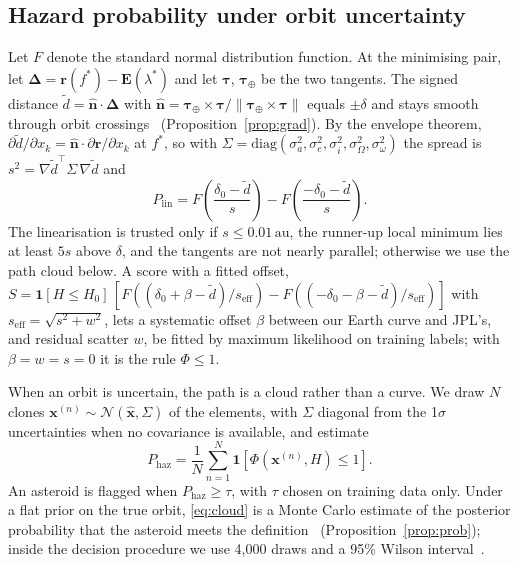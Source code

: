\documentclass[make,article,submit,moreauthors]{Definitions/mdpi}
\newcommand{\au}{\,\mathrm{au}}
\begin{document}
\subsection{Hazard probability under orbit uncertainty}
\label{sec:prob}
Let $F$ denote the standard normal distribution function. At the minimising pair, let $\boldsymbol{\Delta} = \mathbf{r}(f^*) - \mathbf{E}(\lambda^*)$ and let $\boldsymbol{\tau}$, $\boldsymbol{\tau}_\oplus$ be the two tangents. The signed distance $\tilde d = \hat{\mathbf{n}}\cdot\boldsymbol{\Delta}$ with $\hat{\mathbf{n}} = \boldsymbol{\tau}_\oplus\times\boldsymbol{\tau}/\lVert\boldsymbol{\tau}_\oplus\times\boldsymbol{\tau}\rVert$ equals $\pm\delta$ and stays smooth through orbit crossings~\cite{gronchi2007} (Proposition~\ref{prop:grad}). By the envelope theorem, $\partial\tilde d/\partial x_k = \hat{\mathbf{n}}\cdot\partial\mathbf{r}/\partial x_k$ at $f^*$, so with $\Sigma = \mathrm{diag}(\sigma_a^2, \sigma_e^2, \sigma_i^2, \sigma_\Omega^2, \sigma_\omega^2)$ the spread is $s^2 = \nabla\tilde d^{\top}\Sigma\,\nabla\tilde d$ and
\begin{equation}
P_{\mathrm{lin}} = F\!\left(\frac{\delta_0 - \tilde d}{s}\right) - F\!\left(\frac{-\delta_0 - \tilde d}{s}\right).
\label{eq:plin}
\end{equation}
The linearisation is trusted only if $s \le 0.01\au$, the runner-up local minimum lies at least $5s$ above $\delta$, and the tangents are not nearly parallel; otherwise we use the path cloud below. A score with a fitted offset, $S = \mathbf{1}[H \le H_0]\,[F((\delta_0 + \beta - \tilde d)/s_{\mathrm{eff}}) - F((-\delta_0 - \beta - \tilde d)/s_{\mathrm{eff}})]$ with $s_{\mathrm{eff}} = \sqrt{s^2 + w^2}$, lets a systematic offset $\beta$ between our Earth curve and JPL's, and residual scatter $w$, be fitted by maximum likelihood on training labels; with $\beta = w = s = 0$ it is the rule $\Phi \le 1$.

When an orbit is uncertain, the path is a cloud rather than a curve. We draw $N$ clones $\mathbf{x}^{(n)} \sim \mathcal{N}(\hat{\mathbf{x}}, \Sigma)$ of the elements, with $\Sigma$ diagonal from the 1$\sigma$ uncertainties when no covariance is available, and estimate
\begin{equation}
P_{\mathrm{haz}} = \frac{1}{N}\sum_{n=1}^{N} \mathbf{1}\!\left[ \Phi(\mathbf{x}^{(n)}, H) \le 1 \right].
\label{eq:cloud}
\end{equation}
An asteroid is flagged when $P_{\mathrm{haz}} \ge \tau$, with $\tau$ chosen on training data only. Under a flat prior on the true orbit, \eqref{eq:cloud} is a Monte Carlo estimate of the posterior probability that the asteroid meets the definition~\cite{milani_gronchi2009} (Proposition~\ref{prop:prob}); inside the decision procedure we use 4,000 draws and a 95\% Wilson interval~\cite{wilson1927}.
\end{document}
